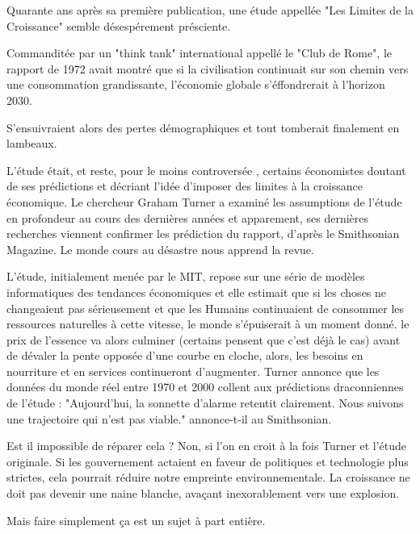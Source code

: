 \documentclass[a4paper,11pt]{article}
\begin{document}
\begin{multicols}{2}
Quarante ans après sa première publication, une étude appellée "Les Limites de la Croissance" semble désespérement
présciente.

Commanditée par un "think tank" international appellé le "Club de Rome", le rapport de 1972 avait montré que si la
civilisation continuait sur son chemin vers une consommation grandissante, l'économie globale s'éffondrerait à l'horizon
2030.

S'ensuivraient alors des pertes démographiques et tout tomberait finalement en lambeaux.

L'étude était, et reste, pour le moins controversée , certains économistes doutant de ses prédictions et décriant
l'idée d'imposer des limites à la croissance économique. Le chercheur Graham Turner a examiné les assumptions de
l'étude en profondeur au cours des dernières années et apparement, ses dernières recherches viennent confirmer les
prédiction du rapport, d'après le Smithsonian Magazine. Le monde cours au désastre nous apprend la revue.

L'étude, initialement menée par le MIT, repose sur une série de modèles informatiques des tendances économiques et elle
estimait que si les choses ne changeaient pas sérieusement et que les Humains continuaient de consommer les ressources
naturelles à cette vitesse, le monde s'épuiserait à un moment donné. le prix de l'essence va alors culminer (certains
pensent que c'est déjà le cas) avant de dévaler la pente opposée d'une courbe en cloche, alors, les besoins en
nourriture et en services continueront d'augmenter. Turner annonce que les données du monde réel entre 1970 et 2000
collent aux prédictions draconniennes de l'étude : "Aujourd'hui, la sonnette d'alarme retentit clairement. Nous suivons
une trajectoire qui n'est pas viable." annonce-t-il au Smithsonian.

Est il impossible de réparer cela ? Non, si l'on en croit à la fois Turner et l'étude originale. Si les gouvernement
actaient en faveur de politiques et technologie plus strictes, cela pourrait réduire notre empreinte environnementale.
La croissance ne doit pas devenir une naine blanche, avaçant inexorablement vers une explosion.

Mais faire simplement ça est un sujet à part entière.

\end{multicols}
\end{document}
